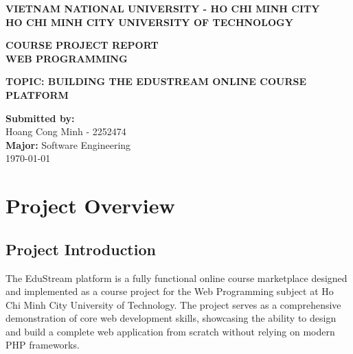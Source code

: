 \documentclass[12pt,a4paper]{report}
\begin{document}
\begin{titlepage}
    \centering
    \vspace*{1cm}

    \Large \textbf{VIETNAM NATIONAL UNIVERSITY - HO CHI MINH CITY} \\
    \Large \textbf{HO CHI MINH CITY UNIVERSITY OF TECHNOLOGY} \\
    \vspace{1.5cm}

    \LARGE \textbf{COURSE PROJECT REPORT} \\
    \vspace{0.5cm}
    \LARGE \textbf{WEB PROGRAMMING} \\
    \vspace{2cm}

    \LARGE \textbf{TOPIC: BUILDING THE EDUSTREAM ONLINE COURSE PLATFORM} \\
    \vspace{3cm}

    \large \textbf{Submitted by:} \\
    Hoang Cong Minh - 2252474 \\
    \vspace{1cm}
    \large \textbf{Major:} Software Engineering \\
    \vfill
    {\large \today}
\end{titlepage}

\tableofcontents
\newpage

\chapter{Project Overview}

\section{Project Introduction}

The EduStream platform is a fully functional online course marketplace designed and implemented as a course project for the Web Programming subject at Ho Chi Minh City University of Technology. The project serves as a comprehensive demonstration of core web development skills, showcasing the ability to design and build a complete web application from scratch without relying on modern PHP frameworks.
\end{document}
